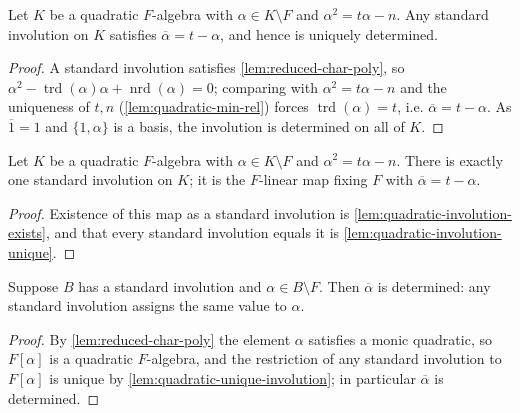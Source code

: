 \begin{lemma}
    \label{lem:quadratic-involution-unique}
    Let $K$ be a quadratic $F$-algebra with $\alpha \in K \setminus F$ and
    $\alpha^2 = t\alpha - n$. Any standard involution on $K$ satisfies
    $\overline{\alpha} = t - \alpha$, and hence is uniquely determined.
\end{lemma}
\begin{proof}
    A standard involution satisfies \ref{lem:reduced-char-poly}, so
    $\alpha^2 - \operatorname{trd}(\alpha)\alpha + \operatorname{nrd}(\alpha) = 0$;
    comparing with $\alpha^2 = t\alpha - n$ and the uniqueness of $t,n$
    (\ref{lem:quadratic-min-rel}) forces $\operatorname{trd}(\alpha) = t$, i.e.
    $\overline\alpha = t - \alpha$. As $\overline 1 = 1$ and $\{1,\alpha\}$ is a
    basis, the involution is determined on all of $K$.
\end{proof}

\begin{lemma}
    \label{lem:quadratic-unique-involution}
    Let $K$ be a quadratic $F$-algebra with $\alpha \in K \setminus F$ and
    $\alpha^2 = t\alpha - n$. There is exactly one standard involution on $K$; it
    is the $F$-linear map fixing $F$ with $\overline{\alpha} = t - \alpha$.
\end{lemma}
\begin{proof}
    Existence of this map as a standard involution is
    \ref{lem:quadratic-involution-exists}, and that every standard involution equals
    it is \ref{lem:quadratic-involution-unique}.
\end{proof}

\begin{lemma}
    \label{lem:involution-determined-outside-base}
    Suppose $B$ has a standard involution and $\alpha \in B \setminus F$. Then
    $\overline\alpha$ is determined: any standard involution assigns the same value
    to $\alpha$.
\end{lemma}
\begin{proof}
    By \ref{lem:reduced-char-poly} the element $\alpha$ satisfies a monic quadratic,
    so $F[\alpha]$ is a quadratic $F$-algebra, and the restriction of any standard
    involution to $F[\alpha]$ is unique by \ref{lem:quadratic-unique-involution};
    in particular $\overline\alpha$ is determined.
\end{proof}

